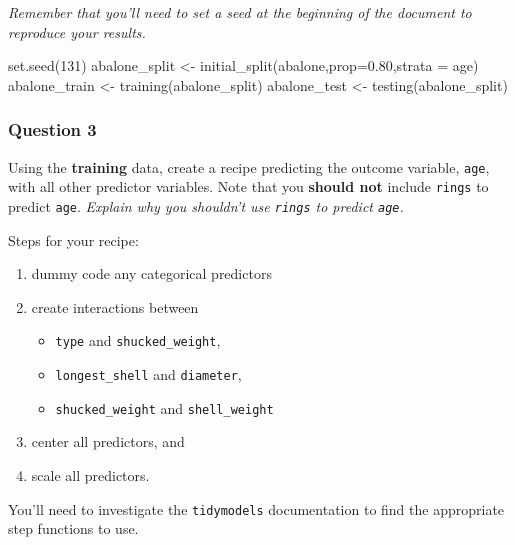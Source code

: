 \documentclass[
]{article}
\newenvironment{Shaded}{\begin{snugshade}}{\end{snugshade}}
\newcommand{\AttributeTok}[1]{\textcolor[rgb]{0.77,0.63,0.00}{#1}}
\newcommand{\DecValTok}[1]{\textcolor[rgb]{0.00,0.00,0.81}{#1}}
\newcommand{\FloatTok}[1]{\textcolor[rgb]{0.00,0.00,0.81}{#1}}
\newcommand{\FunctionTok}[1]{\textcolor[rgb]{0.00,0.00,0.00}{#1}}
\newcommand{\NormalTok}[1]{#1}
\newcommand{\OtherTok}[1]{\textcolor[rgb]{0.56,0.35,0.01}{#1}}
\providecommand{\tightlist}{%
  \setlength{\itemsep}{0pt}\setlength{\parskip}{0pt}}
\begin{document}
\emph{Remember that you'll need to set a seed at the beginning of the
document to reproduce your results.}

\begin{Shaded}
\begin{Highlighting}[]
\FunctionTok{set.seed}\NormalTok{(}\DecValTok{131}\NormalTok{)}
\NormalTok{abalone\_split }\OtherTok{\textless{}{-}} \FunctionTok{initial\_split}\NormalTok{(abalone,}\AttributeTok{prop=}\FloatTok{0.80}\NormalTok{,}\AttributeTok{strata =}\NormalTok{ age)}
\NormalTok{abalone\_train }\OtherTok{\textless{}{-}} \FunctionTok{training}\NormalTok{(abalone\_split)}
\NormalTok{abalone\_test }\OtherTok{\textless{}{-}} \FunctionTok{testing}\NormalTok{(abalone\_split)}
\end{Highlighting}
\end{Shaded}

\hypertarget{question-3}{%
\subsubsection{Question 3}\label{question-3}}

Using the \textbf{training} data, create a recipe predicting the outcome
variable, \texttt{age}, with all other predictor variables. Note that
you \textbf{should not} include \texttt{rings} to predict \texttt{age}.
\emph{Explain why you shouldn't use \texttt{rings} to predict
\texttt{age}.}

Steps for your recipe:

\begin{enumerate}
\def\labelenumi{\arabic{enumi}.}
\item
  dummy code any categorical predictors
\item
  create interactions between

  \begin{itemize}
  \tightlist
  \item
    \texttt{type} and \texttt{shucked\_weight},
  \item
    \texttt{longest\_shell} and \texttt{diameter},
  \item
    \texttt{shucked\_weight} and \texttt{shell\_weight}
  \end{itemize}
\item
  center all predictors, and
\item
  scale all predictors.
\end{enumerate}

You'll need to investigate the \texttt{tidymodels} documentation to find
the appropriate step functions to use.
\end{document}
